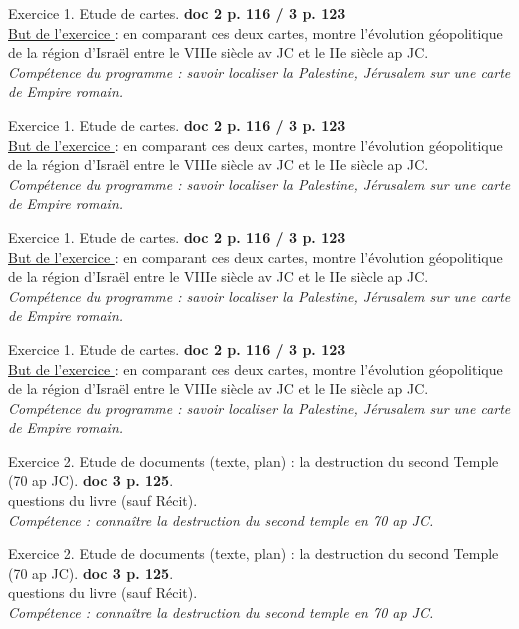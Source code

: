 \documentclass[12pt]{article}
\begin{document}
\vfill

{\large Exercice 1. Etude de cartes.}\textbf{ doc 2 p. 116 / 3 p. 123}\\
\underline{But de l'exercice }: en comparant ces deux cartes, montre l'évolution géopolitique de la région d’Israël entre le VIIIe siècle av JC et le IIe siècle ap JC.\\
\textit{{\small Compétence du programme : savoir localiser la Palestine, Jérusalem sur une carte de Empire romain.}}

\vfill

{\large Exercice 1. Etude de cartes.}\textbf{ doc 2 p. 116 / 3 p. 123}\\
\underline{But de l'exercice }: en comparant ces deux cartes, montre l'évolution géopolitique de la région d’Israël entre le VIIIe siècle av JC et le IIe siècle ap JC.\\
\textit{{\small Compétence du programme : savoir localiser la Palestine, Jérusalem sur une carte de Empire romain.}}

\vfill

{\large Exercice 1. Etude de cartes.}\textbf{ doc 2 p. 116 / 3 p. 123}\\
\underline{But de l'exercice }: en comparant ces deux cartes, montre l'évolution géopolitique de la région d’Israël entre le VIIIe siècle av JC et le IIe siècle ap JC.\\
\textit{{\small Compétence du programme : savoir localiser la Palestine, Jérusalem sur une carte de Empire romain.}}

\vfill

{\large Exercice 1. Etude de cartes.}\textbf{ doc 2 p. 116 / 3 p. 123}\\
\underline{But de l'exercice }: en comparant ces deux cartes, montre l'évolution géopolitique de la région d’Israël entre le VIIIe siècle av JC et le IIe siècle ap JC.\\
\textit{{\small Compétence du programme : savoir localiser la Palestine, Jérusalem sur une carte de Empire romain.}}

\vfill

\newpage
{\large Exercice 2. Etude de documents (texte, plan) : la destruction du second Temple (70 ap JC)}. \textbf{doc 3 p. 125}.\\
questions du livre (sauf Récit).\\
\textit{{\small Compétence : connaître la destruction du second temple en 70 ap JC.}}

\vfill

{\large Exercice 2. Etude de documents (texte, plan) : la destruction du second Temple (70 ap JC)}. \textbf{doc 3 p. 125}.\\
questions du livre (sauf Récit).\\
\textit{{\small Compétence : connaître la destruction du second temple en 70 ap JC.}}
\end{document}
